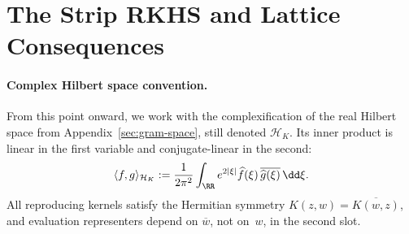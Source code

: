 
\section{The Strip RKHS and Lattice Consequences}%
\label{sec:strip-lattice}

\paragraph{Complex Hilbert space convention.}
From this point onward, we work with the complexification of the real
Hilbert space from Appendix~\ref{sec:gram-space}, still denoted
$\mathcal H_K$.  Its inner product is linear in the first variable and
conjugate-linear in the second:
\[
\langle f,g\rangle_{\mathcal H_K}
:=\frac{1}{2\pi^2}\int_{\RR}e^{2|\xi|}\widehat f(\xi)\,
\overline{\widehat g(\xi)}\,\dd\xi.
\]
All reproducing kernels satisfy the Hermitian symmetry
$K(z,w)=\overline{K(w,z)}$, and evaluation representers depend on
$\overline w$, not on~$w$, in the second slot.

